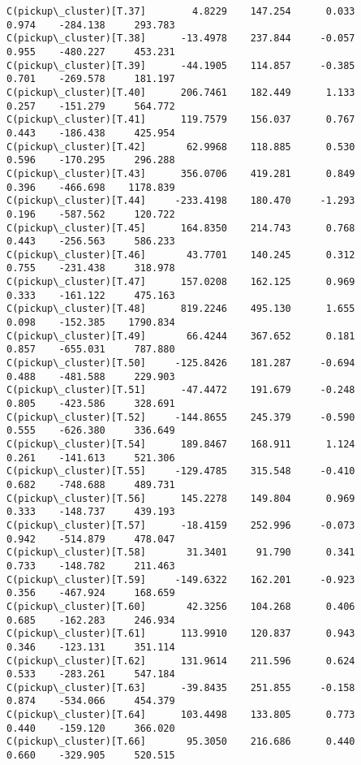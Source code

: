 \documentclass[11pt]{article}
\begin{document}
\begin{Verbatim}[commandchars=\\\{\}]
C(pickup\_cluster)[T.37]        4.8229    147.254      0.033      0.974    -284.138     293.783
C(pickup\_cluster)[T.38]      -13.4978    237.844     -0.057      0.955    -480.227     453.231
C(pickup\_cluster)[T.39]      -44.1905    114.857     -0.385      0.701    -269.578     181.197
C(pickup\_cluster)[T.40]      206.7461    182.449      1.133      0.257    -151.279     564.772
C(pickup\_cluster)[T.41]      119.7579    156.037      0.767      0.443    -186.438     425.954
C(pickup\_cluster)[T.42]       62.9968    118.885      0.530      0.596    -170.295     296.288
C(pickup\_cluster)[T.43]      356.0706    419.281      0.849      0.396    -466.698    1178.839
C(pickup\_cluster)[T.44]     -233.4198    180.470     -1.293      0.196    -587.562     120.722
C(pickup\_cluster)[T.45]      164.8350    214.743      0.768      0.443    -256.563     586.233
C(pickup\_cluster)[T.46]       43.7701    140.245      0.312      0.755    -231.438     318.978
C(pickup\_cluster)[T.47]      157.0208    162.125      0.969      0.333    -161.122     475.163
C(pickup\_cluster)[T.48]      819.2246    495.130      1.655      0.098    -152.385    1790.834
C(pickup\_cluster)[T.49]       66.4244    367.652      0.181      0.857    -655.031     787.880
C(pickup\_cluster)[T.50]     -125.8426    181.287     -0.694      0.488    -481.588     229.903
C(pickup\_cluster)[T.51]      -47.4472    191.679     -0.248      0.805    -423.586     328.691
C(pickup\_cluster)[T.52]     -144.8655    245.379     -0.590      0.555    -626.380     336.649
C(pickup\_cluster)[T.54]      189.8467    168.911      1.124      0.261    -141.613     521.306
C(pickup\_cluster)[T.55]     -129.4785    315.548     -0.410      0.682    -748.688     489.731
C(pickup\_cluster)[T.56]      145.2278    149.804      0.969      0.333    -148.737     439.193
C(pickup\_cluster)[T.57]      -18.4159    252.996     -0.073      0.942    -514.879     478.047
C(pickup\_cluster)[T.58]       31.3401     91.790      0.341      0.733    -148.782     211.463
C(pickup\_cluster)[T.59]     -149.6322    162.201     -0.923      0.356    -467.924     168.659
C(pickup\_cluster)[T.60]       42.3256    104.268      0.406      0.685    -162.283     246.934
C(pickup\_cluster)[T.61]      113.9910    120.837      0.943      0.346    -123.131     351.114
C(pickup\_cluster)[T.62]      131.9614    211.596      0.624      0.533    -283.261     547.184
C(pickup\_cluster)[T.63]      -39.8435    251.855     -0.158      0.874    -534.066     454.379
C(pickup\_cluster)[T.64]      103.4498    133.805      0.773      0.440    -159.120     366.020
C(pickup\_cluster)[T.66]       95.3050    216.686      0.440      0.660    -329.905     520.515

\end{Verbatim}
\end{document}
